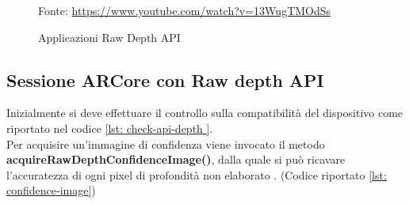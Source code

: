 \documentclass[crop=false, class=book]{standalone}
\begin{document}
		\begin{figure}
				\centering
				{Fonte: \url{https://www.youtube.com/watch?v=13WugTMOdSs}}
				\caption{Applicazioni Raw Depth API }
				\label{fig: app-depth-raw-api}
		\end{figure}
		\subsection{Sessione ARCore con Raw depth API}
		
		Inizialmente si deve effettuare il controllo sulla compatibilità del dispositivo come riportato nel codice \vref{lst: 			check-api-depth }.\\
		Per acquisire un'immagine di confidenza viene invocato il metodo \textbf{acquireRawDepthConfidenceImage()}, dalla 				quale si può ricavare l'accuratezza di ogni pixel di profondità non elaborato \cite{google2022rawdepth}. (Codice 				riportato \vref{lst: confidence-image})
		
\end{document}
